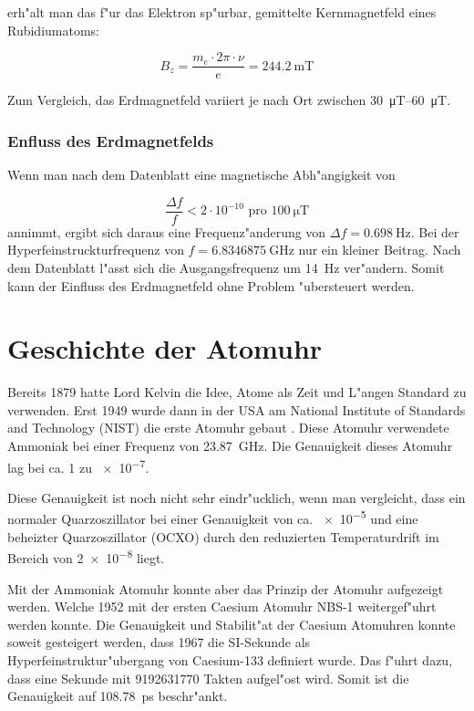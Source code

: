 \begin{refsection}
erh"alt man das f"ur das Elektron sp"urbar, gemittelte Kernmagnetfeld
eines Rubidiumatoms:

\begin{equation*}
  B_z = \dfrac{m_e\cdot2\pi\cdot\nu}{e} = \SI{244.2}{\milli\tesla}
\end{equation*}

Zum Vergleich, das Erdmagnetfeld variiert je nach Ort zwischen
\SIrange[range-phrase={ bis }, range-units=single]{30}{60}{\micro\tesla}.

\subsubsection{Enfluss des Erdmagnetfelds}
Wenn man nach dem Datenblatt \cite{datasheet:prs10m} eine magnetische
Abh"angigkeit von

\begin{equation*}
  \dfrac{\Delta f}{f} < 2\cdot 10^{-10} \text{ pro } \SI{100}{\micro\tesla}
\end{equation*}
annimmt, ergibt sich daraus eine Frequenz"anderung von \(\Delta
f=\SI{0.698}{\hertz}\).  Bei der Hyperfeinstruckturfrequenz von \(f =
\SI{6.8346875}{\giga\hertz}\) nur ein kleiner Beitrag.  Nach dem
Datenblatt l"asst sich die Ausgangsfrequenz um \SI{14}{\hertz}
ver"andern.  Somit kann der Einfluss des Erdmagnetfeld ohne Problem
"ubersteuert werden.

\section{Geschichte der Atomuhr}
\label{sec:gesch-der-atom}
Bereits 1879 hatte Lord Kelvin die Idee, Atome als Zeit und L"angen
Standard zu verwenden.  Erst 1949 wurde dann in der USA am National
Institute of Standards and Technology (NIST) die erste Atomuhr gebaut
\cite{ieee:nist}.  Diese Atomuhr verwendete Ammoniak bei einer
Frequenz von \SI{23.87}{\giga\hertz}.  Die Genauigkeit dieses Atomuhr
lag bei ca. 1 zu \num{e-7}.

Diese Genauigkeit ist noch nicht sehr eindr"ucklich, wenn man
vergleicht, dass ein normaler Quarzoszillator bei einer Genauigkeit
von ca. \num{e-5} und eine beheizter Quarzoszillator (OCXO) durch den
reduzierten Temperaturdrift im Bereich von \num{2e-8} liegt.

Mit der Ammoniak Atomuhr konnte aber das Prinzip der Atomuhr
aufgezeigt werden.  Welche 1952 mit der ersten Caesium Atomuhr NBS-1
weitergef"uhrt werden konnte.  Die Genauigkeit und Stabilit"at der
Caesium Atomuhren konnte soweit gesteigert werden, dass 1967 die
SI-Sekunde als Hyperfeinstruktur"ubergang von Caesium-133 definiert
wurde.  Das f"uhrt dazu, dass eine Sekunde mit \num{9192631770} Takten
aufgel"ost wird.  Somit ist die Genauigkeit auf
\SI{108.78}{\pico\second} beschr"ankt.


\end{refsection}
